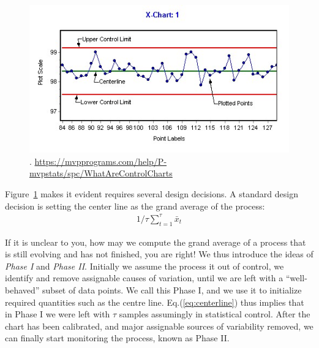 \begin{figure}[h]
\centering
\includegraphics[height=0.3\textheight]{art/X-chartExample}
\caption[\barxChart]{\barxChart. \newline \url{https://mvpprograms.com/help/P-mvpstats/spc/WhatAreControlCharts}}
\label{fig:bar_x_chart}
\end{figure}






Figure~\ref{fig:bar_x_chart} makes it evident \barxChart requires several design decisions.
A standard design decision is setting the center line as the grand average of the process: 
\begin{align}
\label{eq:centerline}
	1/\tau \sum_{t=1}^\tau \bar{x}_t
\end{align}


If it is unclear to you, how may we compute the grand average of a process that is still evolving and has not finished, you are right! We thus introduce the ideas of \emph{Phase I} and \emph{Phase II}. 
Initially we assume the process it out of control, we identify and remove assignable causes of variation, until we are left with a ``well-behaved'' subset of data points. We call this Phase I, and we use it to initialize required quantities such as the centre line. 
Eq.(\ref{eq:centerline}) thus implies that in Phase I we were left with $\tau$ samples assumingly in statistical control.
After the chart has been calibrated, and major assignable sources of variability removed, we can finally start monitoring the process, known as Phase II.



